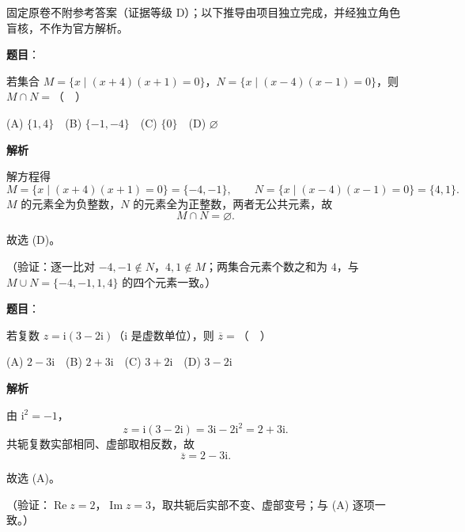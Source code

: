 
\begin{gktip}
固定原卷不附参考答案（证据等级 D）；以下推导由项目独立完成，并经独立角色盲核，不作为官方解析。
\end{gktip}

\begin{answer}

\textbf{题目}：

若集合 \(M=\{x\mid (x+4)(x+1)=0\}\)，\(N=\{x\mid (x-4)(x-1)=0\}\)，则 \(M\cap N=\)（　）

(A) \(\{1,4\}\)　(B) \(\{-1,-4\}\)　(C) \(\{0\}\)　(D) \(\varnothing\)

\textbf{解析}

解方程得
\nopagebreak[4]
\[
M=\{x\mid (x+4)(x+1)=0\}=\{-4,-1\},\qquad
N=\{x\mid (x-4)(x-1)=0\}=\{4,1\}.
\]
\(M\) 的元素全为负整数，\(N\) 的元素全为正整数，两者无公共元素，故
\nopagebreak[4]
\[
M\cap N=\varnothing.
\]

故选 (D)。

（验证：逐一比对 \(-4,-1\notin N\)，\(4,1\notin M\)；两集合元素个数之和为 \(4\)，与 \(M\cup N=\{-4,-1,1,4\}\) 的四个元素一致。）


\end{answer}
\begin{answer}

\textbf{题目}：

若复数 \(z=\mathrm{i}(3-2\mathrm{i})\)（\(\mathrm{i}\) 是虚数单位），则 \(\overline{z}=\)（　）

(A) \(2-3\mathrm{i}\)　(B) \(2+3\mathrm{i}\)　(C) \(3+2\mathrm{i}\)　(D) \(3-2\mathrm{i}\)

\textbf{解析}

由 \(\mathrm{i}^2=-1\)，
\nopagebreak[4]
\[
z=\mathrm{i}(3-2\mathrm{i})=3\mathrm{i}-2\mathrm{i}^2=2+3\mathrm{i}.
\]
共轭复数实部相同、虚部取相反数，故
\nopagebreak[4]
\[
\overline{z}=2-3\mathrm{i}.
\]

故选 (A)。

（验证：\(\operatorname{Re}z=2\)，\(\operatorname{Im}z=3\)，取共轭后实部不变、虚部变号；与 (A) 逐项一致。）


\end{answer}
